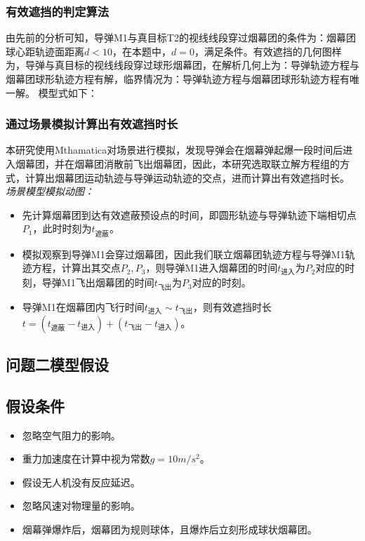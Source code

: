 \documentclass{article}
\begin{document}
\subsubsection{有效遮挡的判定算法}

由先前的分析可知，导弹M1与真目标T2的视线线段穿过烟幕团的条件为：烟幕团球心距轨迹面距离$d<10$，在本题中，$d = 0$，满足条件。有效遮挡的几何图样为，导弹与真目标的视线线段穿过球形烟幕团，在解析几何上为：导弹轨迹方程与烟幕团球形轨迹方程有解，临界情况为：导弹轨迹方程与烟幕团球形轨迹方程有唯一解。
模型式如下：
\subsubsection{通过场景模拟计算出有效遮挡时长}
本研究使用Mthamatica对场景进行模拟，发现导弹会在烟幕弹起爆一段时间后进入烟幕团，并在烟幕团消散前飞出烟幕团，因此，本研究选取联立解方程组的方式，计算出烟幕团运动轨迹与导弹运动轨迹的交点，进而计算出有效遮挡时长。
\textit{场景模型模拟动图：}

\begin{itemize}
    \item 先计算烟幕团到达有效遮蔽预设点的时间，即圆形轨迹与导弹轨迹下端相切点$P_1$，此时时刻为$t_\text{遮蔽}$。
    \item 模拟观察到导弹M1会穿过烟幕团，因此我们联立烟幕团轨迹方程与导弹M1轨迹方程，计算出其交点$P_2,P_3$，则导弹M1进入烟幕团的时间$t_{\text{进入}}$为$P_2$对应的时刻，导弹M1飞出烟幕团的时间$t_{\text{飞出}}$为$P_3$对应的时刻。
    \item 导弹M1在烟幕团内飞行时间$t_{\text{进入}} \sim t_{\text{飞出}}$，则有效遮挡时长$t =(t_\text{遮蔽}- t_\text{进入}) + (t_{\text{飞出}} - t_{\text{进入}})$。
\end{itemize}
\subsection{问题二模型假设}

\subsection{假设条件}
\begin{itemize}
    \item 忽略空气阻力的影响。
    \item 重力加速度在计算中视为常数$g = 10m/s^2$。
    \item 假设无人机没有反应延迟。
    \item 忽略风速对物理量的影响。
    \item 烟幕弹爆炸后，烟幕团为规则球体，且爆炸后立刻形成球状烟幕团。
\end{itemize}
\end{document}
